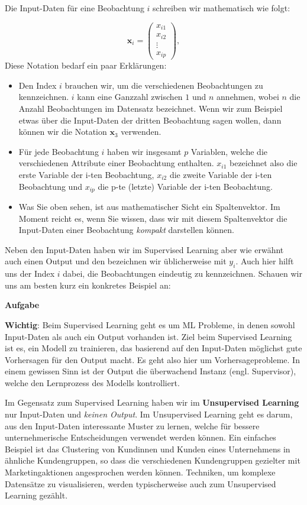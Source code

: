 \documentclass[
]{book}
\providecommand{\tightlist}{%
  \setlength{\itemsep}{0pt}\setlength{\parskip}{0pt}}
\begin{document}
Die Input-Daten für eine Beobachtung \(i\) schreiben wir mathematisch wie folgt:

\[
\mathbf{x}_i=\begin{pmatrix} x_{i1} \\ x_{i2} \\ \vdots \\ x_{ip} \end{pmatrix},
\]
Diese Notation bedarf ein paar Erklärungen:

\begin{itemize}
\tightlist
\item
  Den Index \(i\) brauchen wir, um die verschiedenen Beobachtungen zu kennzeichnen. \(i\) kann eine Ganzzahl zwischen \(1\) und \(n\) annehmen, wobei \(n\) die Anzahl Beobachtungen im Datensatz bezeichnet. Wenn wir zum Beispiel etwas über die Input-Daten der dritten Beobachtung sagen wollen, dann können wir die Notation \(\mathbf{x}_3\) verwenden.
\item
  Für jede Beobachtung \(i\) haben wir insgesamt \(p\) Variablen, welche die verschiedenen Attribute einer Beobachtung enthalten. \(x_{i1}\) bezeichnet also die erste Variable der i-ten Beobachtung, \(x_{i2}\) die zweite Variable der i-ten Beobachtung und \(x_{ip}\) die p-te (letzte) Variable der i-ten Beobachtung.
\item
  Was Sie oben sehen, ist aus mathematischer Sicht ein Spaltenvektor. Im Moment reicht es, wenn Sie wissen, dass wir mit diesem Spaltenvektor die Input-Daten einer Beobachtung \emph{kompakt} darstellen können.
\end{itemize}

Neben den Input-Daten haben wir im Supervised Learning aber wie erwähnt auch einen Output und den bezeichnen wir üblicherweise mit \(y_i\). Auch hier hilft uns der Index \(i\) dabei, die Beobachtungen eindeutig zu kennzeichnen. Schauen wir uns am besten kurz ein konkretes Beispiel an:

\textbf{Aufgabe}

\textbf{Wichtig}: Beim Supervised Learning geht es um ML Probleme, in denen sowohl Input-Daten als auch ein Output vorhanden ist. Ziel beim Supervised Learning ist es, ein Modell zu trainieren, das basierend auf den Input-Daten möglichst gute Vorhersagen für den Output macht. Es geht also hier um Vorhersageprobleme. In einem gewissen Sinn ist der Output die überwachend Instanz (engl. Supervisor), welche den Lernprozess des Modells kontrolliert.

Im Gegensatz zum Supervised Learning haben wir im \textbf{Unsupervised Learning} nur Input-Daten und \emph{keinen Output}. Im Unsupervised Learning geht es darum, aus den Input-Daten interessante Muster zu lernen, welche für bessere unternehmerische Entscheidungen verwendet werden können. Ein einfaches Beispiel ist das Clustering von Kundinnen und Kunden eines Unternehmens in ähnliche Kundengruppen, so dass die verschiedenen Kundengruppen gezielter mit Marketingaktionen angesprochen werden können. Techniken, um komplexe Datensätze zu visualisieren, werden typischerweise auch zum Unsupervised Learning gezählt.
\end{document}
